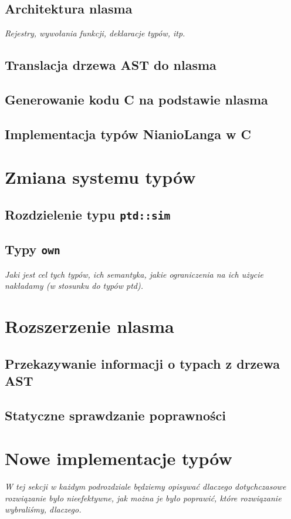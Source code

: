 \documentclass[licencjacka]{pracamgr}
\begin{document}
\section{Architektura nlasma}
  \emph{Rejestry, wywołania funkcji, deklaracje typów, itp.}
\section{Translacja drzewa AST do nlasma}
\section{Generowanie kodu C na podstawie nlasma}
\section{Implementacja typów NianioLanga w C}

\chapter{Zmiana systemu typów}
\section{Rozdzielenie typu \texttt{ptd::sim}}
\section{Typy \texttt{own}}
  \emph{Jaki jest cel tych typów, ich semantyka, jakie ograniczenia na ich użycie
    nakładamy (w stosunku do typów ptd).}


\chapter{Rozszerzenie nlasma}
\section{Przekazywanie informacji o typach z drzewa AST}
\section{Statyczne sprawdzanie poprawności}

\chapter{Nowe implementacje typów}
  \emph{W tej sekcji w każdym podrozdziale będziemy opisywać dlaczego
    dotychczasowe rozwiązanie było nieefektywne, jak można je
    było poprawić, które rozwiązanie wybraliśmy, dlaczego.}
\end{document}

